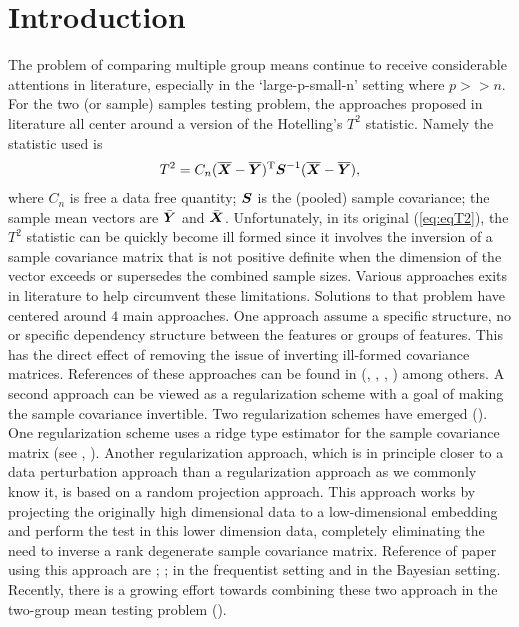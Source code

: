 \documentclass[12pt]{article}
\def\be{\begin{eqnarray}}
\def\ee{\end{eqnarray}}
\def\trans{^{\rm T}}
\newcommand{\uS}       {\mbox{\boldmath$S$}}
\newcommand{\uX}       {\mbox{\boldmath$X$}}
\newcommand{\uY}       {\mbox{\boldmath$Y$}}
\begin{document}
\section{Introduction} \label{sec:intro}
The problem of comparing multiple group means continue to receive considerable attentions in literature, especially in the ‘large-p-small-n’ setting where $p >> n$. For the two (or sample) samples testing problem, the approaches proposed in literature all center around a version of the Hotelling's $T^2$ statistic. Namely the statistic used is
\be
T^{2} = C_{n}(\overline{\uX} - \overline{\uY})\trans\uS^{-1} (\overline{\uX} - \overline{\uY}), \label{eq:eqT2}
\ee
where $C_{n}$ is free a data free quantity; $\uS$ is the (pooled) sample covariance; the sample mean vectors are $\bar{\uY}$ and $\bar{\uX}$.
Unfortunately, in its original (\ref{eq:eqT2}), the $T^2$ statistic can be quickly become ill formed since it involves the inversion of a sample covariance matrix that is not positive definite when the dimension of the vector exceeds or supersedes the combined sample sizes. Various approaches exits in literature to help circumvent these limitations. Solutions to that problem have centered around $4$ main approaches. One approach assume a specific structure, no or specific dependency structure between the features or groups of features. This has the direct effect of removing the issue of inverting ill-formed covariance matrices. References of these approaches can be found in (\citealp{bai1996effect}, \citealp{chen2010two}, \citealp{ahmad2014u}, \citealp{feng2017composite}) among others. A second approach can be viewed as a regularization scheme with a goal of making the sample covariance invertible. Two regularization schemes have emerged (\citealp{hu2020pairwise}). One regularization scheme uses a ridge type estimator for the sample covariance matrix (see \citealp{chen2011regularized}, \citealp{li2020adaptable}). Another regularization approach, which is in principle closer to a data perturbation approach than a regularization approach as we commonly know it, is based on a random projection approach. This approach works by projecting the originally high dimensional data to a low-dimensional embedding and perform the test in this lower dimension data, completely eliminating the need to inverse a rank degenerate sample covariance matrix. Reference of paper using this approach are \cite{lopes2011more}; \cite{thulin2014high}; \cite{srivastava2014raptt} in the frequentist setting and \cite{zoh2018powerful} in the Bayesian setting. Recently, there is a growing effort towards combining these two approach in the two-group mean testing problem (\citealp{hu2020pairwise}).
\end{document}

